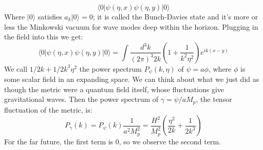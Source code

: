 \documentclass[12 pt]{article}
\begin{document}
\[        \langle 0 | \psi(\eta, x) \psi (\eta, y) |0\rangle       \]
Where $|0\rangle$ satisfies $a_k |0\rangle = 0$; it is called the Bunch-Davies state and it's more or less the Minkowski vacuum for wave modes deep within the horizon. Plugging in the field into this we get:
\[        \langle 0 | \psi(\eta, x) \psi (\eta, y) |0\rangle  = \int \frac{d^3 k}{(2\pi)^3 2k} \left( 1 + \frac{1}{k^2 \eta^2}  \right) e^{ik(x-y)}    \]
We call $1/2k + 1/2k^3\eta^2$ the power spectrum $P_{\psi} (k, \eta)$ of $\psi = a \phi$, where $\phi$ is some scalar field in an expanding space. We can think about what we just did as though the metric were a quantum field itself, whose fluctuations give gravitational waves. Then the power spectrum of $\gamma = \psi/aM_p$, the tensor fluctuation of the metric, is:
\[       P_{\gamma} (k) = P_{\psi} (k) \frac{1}{a^2 M_p^2} = \frac{H^2}{M_p^2} \left(  \frac{\eta^2}{2k} + \frac{1}{2k^3}  \right)      \]
For the far future, the first term is 0, so we observe the second term.
\end{document}
